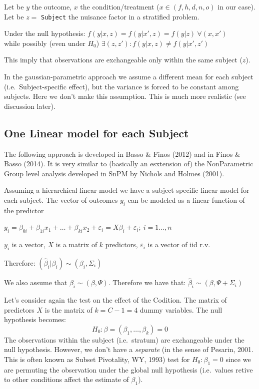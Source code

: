 \documentclass[
]{article}
\begin{document}
Let be \(y\) the outcome, \(x\) the condition/treatment
(\(x\in (f,h,d,n,o)\) in our case). Let be \(z=\) \texttt{Subject} the
nuisance factor in a stratified problem.

Under the null hypothesis:
\(f(y|x,z)=f(y|x',z)=f(y|z) \ \forall (x,x')\)\\
while possibly (even under \(H_0\))
\(\exists (z,z'): f(y|x,z) \neq f(y|x',z')\)

This imply that observations are exchangeable only within the same
subject (\(z\)).

In the gaussian-parametric approach we assume a different mean for each
subject (i.e.~Subject-specific effect), but the variance is forced to be
constant among subjects. Here we don't make this assumption. This is
much more realistic (see discussion later).

\hypertarget{one-linear-model-for-each-subject}{%
\subsection{One Linear model for each
Subject}\label{one-linear-model-for-each-subject}}

The following approach is developed in Basso \& Finos (2012) and in
Finos \& Basso (2014). It is very similar to (basically an esxtension
of) the NonParametric Group level analysis developed in SnPM by Nichols
and Holmes (2001).

Assuming a hierarchical linear model we have a subject-specific linear
model for each subject. The vector of outcomes \(y_i\) can be modeled as
a linear function of the predictor

\(y_i=\beta_{0i}+\beta_{1i}x_1+\ldots+\beta_{ki}x_2+\varepsilon_i=X\beta_i+\varepsilon_i; \ i=1\ldots,n\)

\(y_i\) is a vector, \(X\) is a matrix of \(k\) predictors,
\(\varepsilon_i\) is a vector of iid r.v.

Therefore: \((\hat\beta_i|\beta_i)\sim (\beta_i,\Sigma_i)\)

We also assume that \(\beta_i\sim(\beta,\Psi)\). Therefore we have that:
\(\hat\beta_i\sim (\beta,\Psi+\Sigma_i)\)

Let's consider again the test on the effect of the Codition. The matrix
of predictors \(X\) is the matrix of \(k=C-1=4\) dummy variables. The
null hypothesis becomes: \[H_0: \beta=(\beta_1,\ldots,\beta_k)=0\] The
observations within the subject (i.e.~stratum) are exchangeable under
the null hypothesis. However, we don't have a \emph{separate} (in the
sense of Pesarin, 2001. This is often known as Subset Pivotality, WY,
1993) test for \(H_0:\beta_1=0\) since we are permuting the observation
under the global null hypothesis (i.e.~values retive to other conditions
affect the estimate of \(\beta_1\)).
\end{document}
